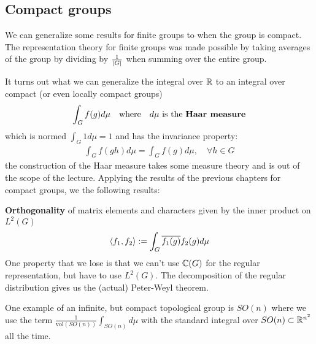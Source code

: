 \subsection{Compact groups}
We can generalize some results for finite groups to when the group is compact.
The representation theory for finite groups was made possible by taking averages of the group by dividing by $\frac{1}{\vert G\vert}$ when summing over the entire group.

It turns out what we can generalize the integral over $\mathbb{R}$ to an integral over compact (or even locally compact groups)
\begin{align*}
  \int_G f(g) d \mu \quad \text{where} \quad d \mu \text{ is the \textbf{Haar measure}}
\end{align*}
which is normed $\int_G 1 d \mu = 1$ and has the invariance property:
\begin{align*}
  \int_G f(gh) d \mu = \int_G f(g) d \mu, \quad \forall h \in G
\end{align*}
the construction of the Haar measure takes some measure theory and is out of the scope of the lecture.
Applying the results of the previous chapters for compact groups, we the following results:

\textbf{Orthogonality} of matrix elements and characters given by the inner product on $L^{2}(G)$
\begin{align*}
  \langle f_1,f_2\rangle := \int_G \overline{f_1(g)}f_2(g) d \mu
\end{align*}
One property that we lose is that we can't use $\mathbb{C}(G)$ for the regular representation, but have to use $L^{2}(G)$.
The decomposition of the regular distribution gives us the (actual) Peter-Weyl theorem.

One example of an infinite, but compact topological group is $SO(n)$ where we use the term $\frac{1}{\text{vol}(SO(n))} \int_{SO(n)} d \mu$ with the standard integral over $SO(n)\subset \mathbb{R}^{n^{2}}$ all the time.






